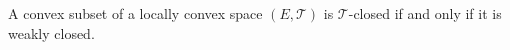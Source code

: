 A convex subset of a locally convex space $(E, \mathcal{T})$ is $\mathcal{T}$-closed if and only if it is weakly closed.
